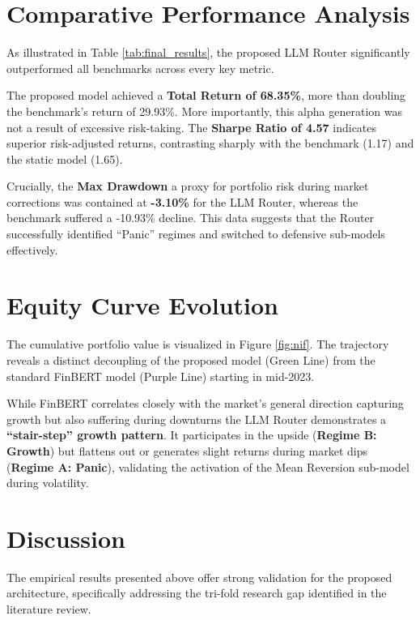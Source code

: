\documentclass[12pt, a4paper]{report}
\begin{document}
\section{Comparative Performance Analysis}

As illustrated in Table \ref{tab:final_results}, the proposed LLM Router significantly outperformed all benchmarks across every key metric. 

The proposed model achieved a \textbf{Total Return of 68.35\%}, more than doubling the benchmark’s return of 29.93\%. More importantly, this alpha generation was not a result of excessive risk-taking. The \textbf{Sharpe Ratio of 4.57} indicates superior risk-adjusted returns, contrasting sharply with the benchmark (1.17) and the static model (1.65).

Crucially, the \textbf{Max Drawdown} a proxy for portfolio risk during market corrections was contained at \textbf{-3.10\%} for the LLM Router, whereas the benchmark suffered a -10.93\% decline. This data suggests that the Router successfully identified ``Panic'' regimes and switched to defensive sub-models effectively.

\section{Equity Curve Evolution}

The cumulative portfolio value is visualized in Figure \ref{fig:nif}. The trajectory reveals a distinct decoupling of the proposed model (Green Line) from the standard FinBERT model (Purple Line) starting in mid-2023. 

While FinBERT correlates closely with the market's general direction capturing growth but also suffering during downturns the LLM Router demonstrates a \textbf{``stair-step'' growth pattern}. It participates in the upside (\textbf{Regime B: Growth}) but flattens out or generates slight returns during market dips (\textbf{Regime A: Panic}), validating the activation of the Mean Reversion sub-model during volatility.

\section{Discussion}

The empirical results presented above offer strong validation for the proposed architecture, specifically addressing the tri-fold research gap identified in the literature review.
\end{document}
